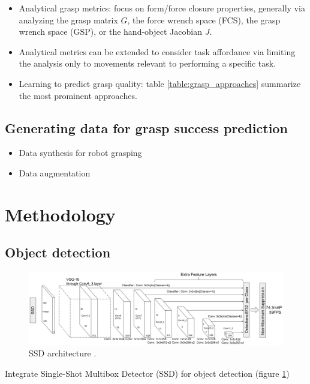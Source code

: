 \documentclass[runningheads]{../llncs}
\begin{document}
\begin{itemize}
    \item Analytical grasp metrics: focus on form/force closure properties, generally via analyzing the grasp matrix
            $ G $, the force wrench space (FCS), the grasp wrench space (GSP), or the hand-object Jacobian $ J $.
    \item Analytical metrics can be extended to consider task affordance via limiting the analysis only to movements 
            relevant to performing a specific task.
    \item Learning to predict grasp quality: table \ref{table:grasp_approaches} summarize the most prominent approaches.
\end{itemize}

\subsection{Generating data for grasp success prediction}
\begin{itemize}
    \item Data synthesis for robot grasping
    \item Data augmentation
\end{itemize}

\section{Methodology}

\subsection{Object detection}

\begin{figure}[h!]
    \centering
    \includegraphics[width=\textwidth]{liu_et_al-2016-ssd_arch}
    \caption{SSD architecture \cite{Liu2016SSD}.}
    \label{fig:ssd_arch}
\end{figure}

Integrate Single-Shot Multibox Detector (SSD) for object detection (figure \ref{fig:ssd_arch})
\end{document}
